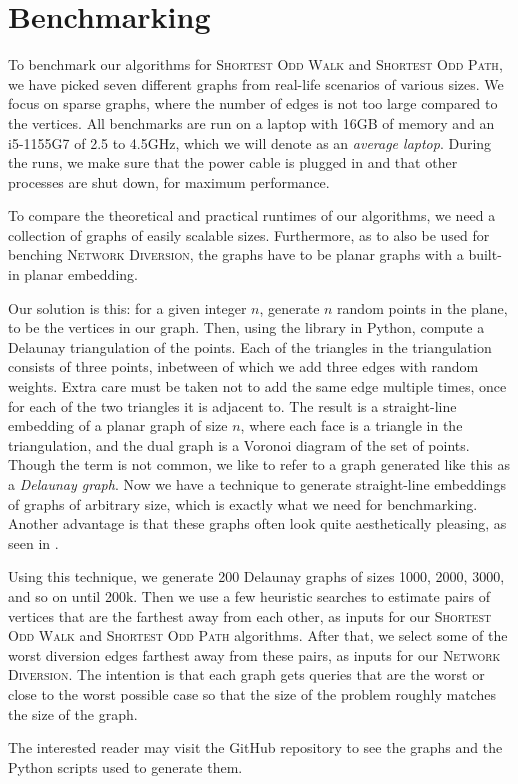 \section{Benchmarking}
\label{section:benchmarking}
To benchmark our algorithms for \textsc{Shortest Odd Walk} and \textsc{Shortest Odd Path}, we have picked seven different graphs from real-life scenarios of various sizes. We focus on sparse graphs, where the number of edges is not too large compared to the vertices. All benchmarks are run on a laptop with 16GB of memory and an i5-1155G7 of 2.5 to 4.5GHz, which we will denote as an \emph{average laptop}. During the runs, we make sure that the power cable is plugged in and that other processes are shut down, for maximum performance.

To compare the theoretical and practical runtimes of our algorithms, we need a collection of graphs of easily scalable sizes. Furthermore, as to also be used for benching \textsc{Network Diversion}, the graphs have to be planar graphs with a built-in planar embedding.

Our solution is this: for a given integer $n$, generate $n$ random points in the plane, to be the vertices in our graph. Then, using the  library in Python, compute a Delaunay triangulation of the points. Each of the triangles in the triangulation consists of three points, inbetween of which we add three edges with random weights. Extra care must be taken not to add the same edge multiple times, once for each of the two triangles it is adjacent to. The result is a straight-line embedding of a planar graph of size $n$, where each face is a triangle in the triangulation, and the dual graph is a Voronoi diagram of the set of points. Though the term is not common, we like to refer to a graph generated like this as a \emph{Delaunay graph}. Now we have a technique to generate straight-line embeddings of graphs of arbitrary size, which is exactly what we need for benchmarking. Another advantage is that these graphs often look quite aesthetically pleasing, as seen in .

Using this technique, we generate 200 Delaunay graphs of sizes 1000, 2000, 3000, and so on until 200k. Then we use a few heuristic searches to estimate pairs of vertices that are the farthest away from each other, as inputs for our \textsc{Shortest Odd Walk} and \textsc{Shortest Odd Path} algorithms. After that, we select some of the worst diversion edges farthest away from these pairs, as inputs for our \textsc{Network Diversion}. The intention is that each graph gets queries that are the worst or close to the worst possible case so that the size of the problem roughly matches the size of the graph.

The interested reader may visit the GitHub repository \cite{source:codebase} to see the graphs and the Python scripts used to generate them.
